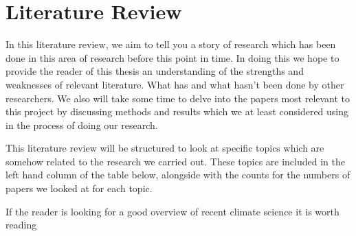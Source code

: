 \documentclass[../main.tex]{subfiles}
\begin{document}
\chapter{Literature Review}
In this literature review, we aim to tell you a story of research which has been done in this area of research before this point in time. In doing this we hope to provide the reader of this thesis an understanding of the strengths and weaknesses of relevant literature. What has and what hasn't been done by other researchers. We also will take some time to delve into the papers most relevant to this project by discussing methods and results which we at least considered using in the process of doing our research.\medskip

This literature review will be structured to look at specific topics which are somehow related to the research we carried out. These topics are included in the left hand column of the table below, alongside with the counts for the numbers of papers we looked at for each topic.

If the reader is looking for a good overview of recent climate science it is worth reading \cite{clem}

% 

% 
% 
% 
% 
% 
% 
\end{document}
